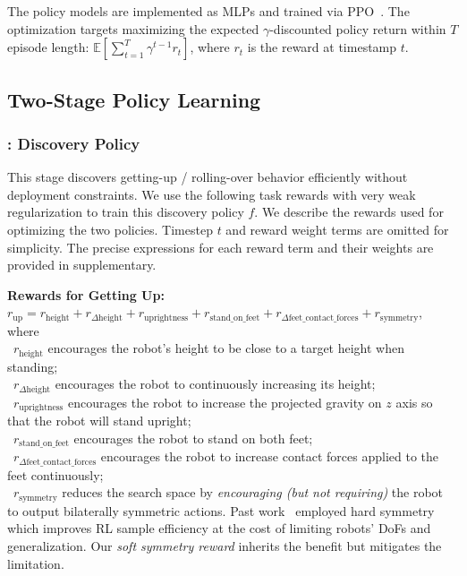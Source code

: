 The policy models are implemented as MLPs and trained via PPO~\cite{PPO17}.
The optimization targets maximizing the expected $\gamma$-discounted policy return within $T$ episode length: 
\(\mathbb{E}\left[\sum_{t=1}^T \gamma^{t-1}r_t\right]\), where $r_t$ is the reward at timestamp $t$.

\subsection{Two-Stage Policy Learning}\label{sec:two-stage-policy}

\subsubsection{\sone: Discovery Policy}\label{sec:stageI}
This stage discovers getting-up / rolling-over behavior efficiently without deployment constraints. We use the following task rewards with very weak regularization to train this discovery policy $f$. We describe the rewards used for optimizing the two policies. Timestep $t$ and reward weight terms are omitted for simplicity. The precise expressions for each reward term and their weights are provided in supplementary.


\vspace{5pt}
\noindent\textbf{Rewards for Getting Up:} $r_{\text{up}} = r_{\text{height}} + r_{\Delta \text{height}} + r_{\text{uprightness}} + r_{\text{stand\_on\_feet}} + r_{\Delta\text{feet\_contact\_forces}} + r_\text{symmetry}$, 
    where \\
    \textbullet~\(r_{\text{height}}\) encourages the robot's height to be close to a target height when standing; \\
    \textbullet~\(r_{\Delta\text{height}}\) encourages the robot to continuously increasing its height; \\
    \textbullet~\(r_{\text{uprightness}}\) encourages the robot to increase the projected gravity on $z$ axis so that the robot will stand upright; \\
    \textbullet~\(r_{\text{stand\_on\_feet}}\) encourages the robot to stand on both feet; \\
    \textbullet~\(r_{\Delta\text{feet\_contact\_forces}}\) encourages the robot to increase contact forces applied to the feet continuously;\\
    \textbullet~\(r_{\text{symmetry}}\) reduces the search space by {\it encouraging (but not requiring)} the robot to output bilaterally symmetric actions. Past work~\cite{SymmetricLeggedLocomotion24,StandUpSymmetry16} employed hard symmetry which improves RL sample efficiency at the cost of limiting robots' DoFs and generalization. Our {\it soft symmetry reward} inherits the benefit but mitigates the limitation.

